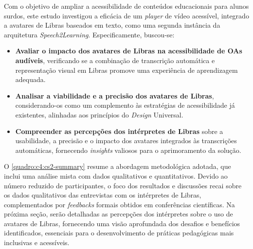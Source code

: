 Com o objetivo de ampliar a acessibilidade de conteúdos educacionais para alunos surdos, este estudo investigou a eficácia de um \textit{player} de vídeo acessível, integrado a avatares de Libras baseados em texto, como uma segunda instância da arquitetura \textit{Speech2Learning}. Especificamente, buscou-se:

\begin{itemize}
\item \textbf{Avaliar o impacto dos avatares de Libras na acessibilidade de OAs audíveis}, verificando se a combinação de transcrição automática e representação visual em Libras promove uma experiência de aprendizagem adequada.
\item \textbf{Analisar a viabilidade e a precisão dos avatares de Libras}, considerando-os como um complemento às estratégias de acessibilidade já existentes, alinhadas aos princípios do \textit{Design} Universal.
\item \textbf{Compreender as percepções dos intérpretes de Libras} sobre a usabilidade, a precisão e o impacto dos avatares integrados às transcrições automáticas, fornecendo \textit{insights} valiosos para o aprimoramento da solução.
\end{itemize}

O \autoref{quadro:c4:cs2-summary} resume a abordagem metodológica adotada, que inclui uma análise mista com dados qualitativos e quantitativos. Devido ao número reduzido de participantes, o foco dos resultados e discussões recai sobre os dados qualitativos das entrevistas com os intérpretes de Libras, complementados por \textit{feedbacks} formais obtidos em conferências científicas. Na próxima seção, serão detalhadas as percepções dos intérpretes sobre o uso de avatares de Libras, fornecendo uma visão aprofundada dos desafios e benefícios identificados, essenciais para o desenvolvimento de práticas pedagógicas mais inclusivas e acessíveis.

